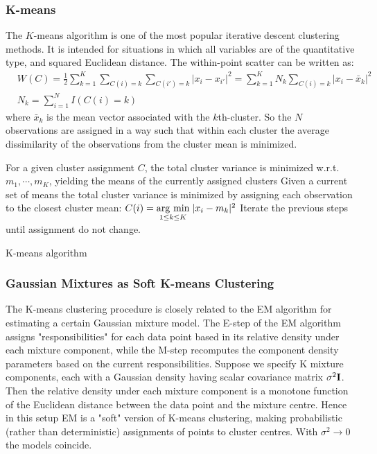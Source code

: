 \subsubsection{K-means}
The $K$-means algorithm is one of the most popular iterative descent clustering methods. It is intended for situations in which all variables are of the quantitative type, and squared Euclidean distance.
The within-point scatter can be written as:
\begin{equation}
\begin{aligned}
&W(C) = \frac{1}{2}\sum_{k=1}^K \sum_{C(i) = k} \sum_{C(i') = k} |x_i - x_{i'}|^2= \sum_{k=1}^K N_k \sum_{C(i) = k}  |x_i - \bar{x}_{k}|^2\\
& N_k = \sum_{i=1}^N I(C(i) = k)
\end{aligned}
\end{equation}
where $\bar{x}_k$ is the mean vector associated with the $k$th-cluster. So the $N$ observations are assigned in a way such that within each cluster the average dissimilarity of the observations from the cluster mean is minimized.
\begin{algorithm}
For a given cluster assignment $C$, the total cluster variance is minimized w.r.t. $m_1, \cdots, m_K$, yielding the means of the currently assigned clusters\;
Given a current set of means the total cluster variance is minimized by assigning each observation to the closest cluster mean: $C(i) = \underset{1\le k\le K}{\operatorname{arg}\,\operatorname{min}}\;{|x_i-m_k|^2}$\;
Iterate the previous steps until assignment do not change.
\caption{K-means algorithm}
\end{algorithm}

\subsubsection{Gaussian Mixtures as Soft K-means Clustering}
The K-means clustering procedure is closely related to the EM algorithm for estimating a certain Gaussian mixture model. The E-step of the EM algorithm assigns "responsibilities" for each data point based in its relative density under each mixture component, while the M-step recomputes the component density parameters based on the current responsibilities. Suppose we specify K mixture components, each with a Gaussian density having scalar covariance matrix $\sigma^2\mathrm{\mathbf{I}}$. Then the relative density under each mixture component is a monotone function of the Euclidean distance between the data point and the mixture centre. Hence in this setup EM is a "soft" version of K-means clustering, making probabilistic (rather than deterministic) assignments of points to cluster centres. With $\sigma^2 \rightarrow 0$  the models coincide.

